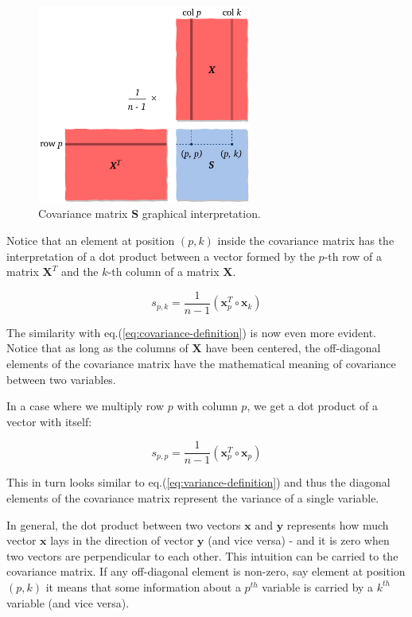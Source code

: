 \documentclass[10pt,twocolumn]{article}
\begin{document}
\begin{figure}[H]
\centering\includegraphics[width=7cm]{cov-matrix.png}
\caption{Covariance matrix $\bm{S}$ graphical interpretation.}
\label{fig:covariance-matrix}
\end{figure}

Notice that an element at position $(p,k)$ inside the covariance matrix has the interpretation of a dot product between a vector formed by the $p$-th row of a matrix $\bm{X}^T$ and the $k$-th column of a matrix $\bm{X}$.

\begin{equation}
s_{p,k} = \frac{1}{n-1} (\bm{x}_p^T \circ \bm{x}_k)
\end{equation}

The similarity with eq.(\ref{eq:covariance-definition}) is now even more evident. Notice that as long as the columns of $\bm{X}$ have been centered, the off-diagonal elements of the covariance matrix have the mathematical meaning of covariance between two variables.

In a case where we multiply row $p$ with column $p$, we get a dot product of a vector with itself:

\begin{equation}
s_{p,p} = \frac{1}{n-1} ( \bm{x}_p^T \circ \bm{x}_p)
\end{equation}

This in turn looks similar to eq.(\ref{eq:variance-definition}) and thus the diagonal elements of the covariance matrix represent the variance of a single variable.

In general, the dot product between two vectors $\bm{x}$ and $\bm{y}$ represents how much vector $\bm{x}$ lays in the direction of vector $\bm{y}$ (and vice versa) - and it is zero when two vectors are perpendicular to each other. This intuition can be carried to the covariance matrix. If any off-diagonal element is non-zero, say element at position $(p,k)$ it means that some information about a $p^{th}$ variable is carried by a $k^{th}$ variable (and vice versa).
\end{document}
